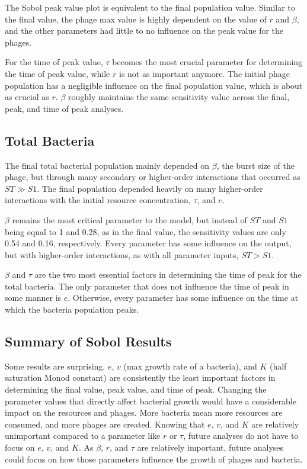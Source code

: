 The Sobol peak value plot is equivalent to the final population value. 
Similar to the final value, the phage max value is highly dependent on the value of $r$ and $\beta$, and the other parameters had little to no influence on the peak value for the phages. 

For the time of peak value, $\tau$ becomes the most crucial parameter for determining the time of peak value, while $r$ is not as important anymore. 
The initial phage population has a negligible influence on the final population value, which is about as crucial as $r$. 
$\beta$ roughly maintains the same sensitivity value across the final, peak, and time of peak analyses. 

\subsection{Total Bacteria}
The final total bacterial population mainly depended on $\beta$, the burst size of the phage, but through many secondary or higher-order interactions that occurred as $ST \gg S1$. 
The final population depended heavily on many higher-order interactions with the initial resource concentration, $\tau$, and $e$. 

$\beta$ remains the most critical parameter to the model, but instead of $ST$ and $S1$ being equal to 1 and 0.28, as in the final value, the sensitivity values are only 0.54 and 0.16, respectively. 
Every parameter has some influence on the output, but with higher-order interactions, as with all parameter inputs, $ST > S1$. 

$\beta$ and $\tau$ are the two most essential factors in determining the time of peak for the total bacteria. 
The only parameter that does not influence the time of peak in some manner is $e$. 
Otherwise, every parameter has some influence on the time at which the bacteria population peaks. 

\subsection{Summary of Sobol Results}
Some results are surprising. 
$e$, $v$ (max growth rate of a bacteria), and $K$ (half saturation Monod constant) are consistently the least important factors in determining the final value, peak value, and time of peak. 
Changing the parameter values that directly affect bacterial growth would have a considerable impact on the resources and phages. 
More bacteria mean more resources are consumed, and more phages are created. 
Knowing that $e$, $v$, and $K$ are relatively unimportant compared to a parameter like $r$ or $\tau$, future analyses do not have to focus on $e$, $v$, and $K$. 
As $\beta$, $r$, and $\tau$ are relatively important, future analyses could focus on how those parameters influence the growth of phages and bacteria. 

